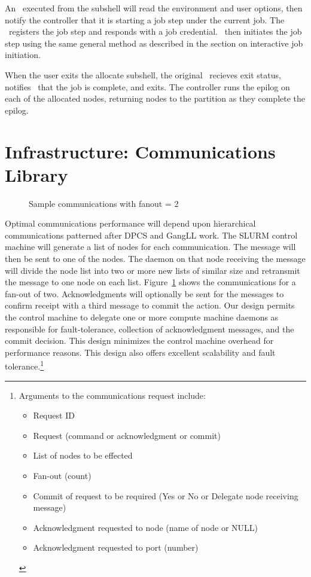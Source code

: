 An \srun\ executed from the subshell will read the environment and
user options, then notify the controller that it is starting a job step
under the current job. The \slurmctld\ registers the job step and responds
with a job credential. \srun\ then initiates the job step using the same
general method as described in the section on interactive job initiation.

When the user exits the allocate subshell, the original \srun\ recieves
exit status, notifies \slurmctld\ that the job is complete, and exits. 
The controller runs the epilog on each of the allocated nodes, returning
nodes to the partition as they complete the epilog.


\section{Infrastructure: Communications Library}

\begin{figure}[htb]
\centerline{}
\caption{Sample communications with fanout = 2}
\label{communicate}
\end{figure}
Optimal communications performance will depend upon hierarchical communications
patterned after DPCS and GangLL work. The SLURM control machine will generate a
list of nodes for each communication. The message will then be sent to one of
the nodes. 
The daemon on that node receiving the message will divide the node list into
two or more new lists of similar size and retransmit the message to one node on
each list. Figure~\ref{communicate} shows the communications for a fan-out of 
two.  Acknowledgments will optionally be sent for the messages to confirm 
receipt with a third message to commit the action. Our design permits the 
control machine to delegate one or more compute machine daemons as responsible 
for fault-tolerance, collection of acknowledgment messages, and the commit
decision. This design minimizes the control machine overhead for performance
reasons. This design also offers excellent scalability and fault 
tolerance.\footnote{Arguments to the communications request include:
\begin{itemize}
\item Request ID
\item Request (command or acknowledgment or commit)
\item List of nodes to be effected
\item Fan-out (count)
\item Commit of request to be required (Yes or No or Delegate node receiving
      message) 
\item Acknowledgment requested to node (name of node or NULL)
\item Acknowledgment requested to port (number)
\end{itemize} }

